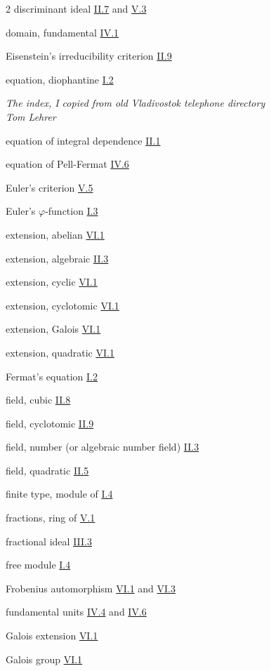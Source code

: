\begin{multicols}{2}
discriminant ideal \hyperref[sec:2.7]{II.7} and \hyperref[sec:5.3]{V.3}

domain, fundamental \hyperref[sec:4.1]{IV.1}

\medskip
Eisenstein's irreducibility criterion \hyperref[sec:2.9]{II.9}

equation, diophantine \hyperref[sec:1.2]{I.2}

\medskip
{\itshape The index, I copied from old Vladivostok telephone directory}\\
{\itshape Tom Lehrer}

\medskip
equation of integral dependence \hyperref[sec:2.1]{II.1}

equation of Pell-Fermat \hyperref[sec:4.6]{IV.6}

Euler's criterion \hyperref[sec:5.5]{V.5}

Euler's $\varphi$-function \hyperref[sec:1.3]{I.3}

extension, abelian \hyperref[sec:6.1]{VI.1}

extension, algebraic \hyperref[sec:2.3]{II.3}

extension, cyclic \hyperref[sec:6.1]{VI.1}

extension, cyclotomic \hyperref[sec:6.1]{VI.1}

extension, Galois \hyperref[sec:6.1]{VI.1}

extension, quadratic \hyperref[sec:6.1]{VI.1}

\medskip
Fermat's equation \hyperref[sec:1.2]{I.2}

field, cubic \hyperref[sec:2.8]{II.8}

field, cyclotomic \hyperref[sec:2.9]{II.9}

field, number (or algebraic number field) \hyperref[sec:2.3]{II.3}

field, quadratic \hyperref[sec:2.5]{II.5}

finite type, module of \hyperref[sec:1.4]{I.4}

fractions, ring of \hyperref[sec:5.1]{V.1}

fractional ideal \hyperref[sec:3.3]{III.3}

free module \hyperref[sec:1.4]{I.4}

Frobenius automorphism \hyperref[sec:6.1]{VI.1} and \hyperref[sec:6.3]{VI.3}

fundamental units \hyperref[sec:4.4]{IV.4} and \hyperref[sec:4.6]{IV.6}

\medskip
Galois extension \hyperref[sec:6.1]{VI.1}

Galois group \hyperref[sec:6.1]{VI.1}


\end{multicols}
